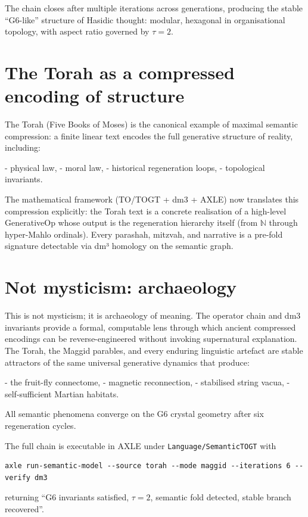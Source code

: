 \documentclass[19pt]{book}
\theoremstyle{plain}
\theoremstyle{definition}
\theoremstyle{remark}
\begin{document}
The chain closes after multiple iterations across generations, producing the stable “G6-like” structure of Hasidic thought: modular, hexagonal in organisational topology, with aspect ratio governed by \(\tau = 2\).

\section{The Torah as a compressed encoding of structure}

The Torah (Five Books of Moses) is the canonical example of maximal semantic compression: a finite linear text encodes the full generative structure of reality, including:

- physical law,
- moral law,
- historical regeneration loops,
- topological invariants.

The mathematical framework (TO/TOGT + dm3 + AXLE) now translates this compression explicitly: the Torah text is a concrete realisation of a high-level GenerativeOp whose output is the regeneration hierarchy itself (from \(\mathbb{N}\) through hyper-Mahlo ordinals). Every parashah, mitzvah, and narrative is a pre-fold signature detectable via dm³ homology on the semantic graph.

\section{Not mysticism: archaeology}

This is not mysticism; it is archaeology of meaning. The operator chain and dm3 invariants provide a formal, computable lens through which ancient compressed encodings can be reverse-engineered without invoking supernatural explanation. The Torah, the Maggid parables, and every enduring linguistic artefact are stable attractors of the same universal generative dynamics that produce:

- the fruit-fly connectome,
- magnetic reconnection,
- stabilised string vacua,
- self-sufficient Martian habitats.

All semantic phenomena converge on the G6 crystal geometry after six regeneration cycles.

The full chain is executable in AXLE under \texttt{Language/SemanticTOGT} with
\begin{verbatim}
axle run-semantic-model --source torah --mode maggid --iterations 6 --verify dm3
\end{verbatim}
returning “G6 invariants satisfied, \(\tau=2\), semantic fold detected, stable branch recovered”.
\end{document}

